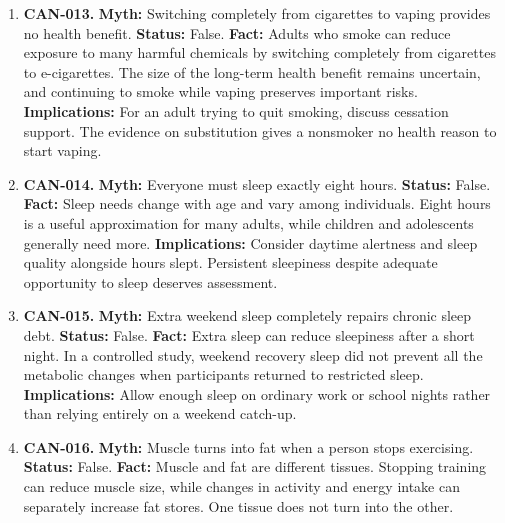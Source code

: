 \documentclass[11pt,oneside]{book}
\begin{document}
\begin{enumerate}[leftmargin=0pt,labelwidth=0pt,labelsep=0pt,itemindent=0pt]
\textbf{Implications:} Persistent cough or breathlessness warrants medical assessment. Describe any vaping and occupational exposures rather than assuming a specific diagnosis.
\item[] \textbf{CAN-013.} \textbf{Myth:} Switching completely from cigarettes to vaping provides no health benefit.\newline
\textbf{Status:} False.\newline
\textbf{Fact:} Adults who smoke can reduce exposure to many harmful chemicals by switching completely from cigarettes to e-cigarettes. The size of the long-term health benefit remains uncertain, and continuing to smoke while vaping preserves important risks. \cite{ref383,ref278}\newline
\textbf{Implications:} For an adult trying to quit smoking, discuss cessation support. The evidence on substitution gives a nonsmoker no health reason to start vaping.
\item[] \textbf{CAN-014.} \textbf{Myth:} Everyone must sleep exactly eight hours.\newline
\textbf{Status:} False.\newline
\textbf{Fact:} Sleep needs change with age and vary among individuals. Eight hours is a useful approximation for many adults, while children and adolescents generally need more. \cite{ref385}\newline
\textbf{Implications:} Consider daytime alertness and sleep quality alongside hours slept. Persistent sleepiness despite adequate opportunity to sleep deserves assessment.
\item[] \textbf{CAN-015.} \textbf{Myth:} Extra weekend sleep completely repairs chronic sleep debt.\newline
\textbf{Status:} False.\newline
\textbf{Fact:} Extra sleep can reduce sleepiness after a short night. In a controlled study, weekend recovery sleep did not prevent all the metabolic changes when participants returned to restricted sleep. \cite{ref386}\newline
\textbf{Implications:} Allow enough sleep on ordinary work or school nights rather than relying entirely on a weekend catch-up.
\item[] \textbf{CAN-016.} \textbf{Myth:} Muscle turns into fat when a person stops exercising.\newline
\textbf{Status:} False.\newline
\textbf{Fact:} Muscle and fat are different tissues. Stopping training can reduce muscle size, while changes in activity and energy intake can separately increase fat stores. One tissue does not turn into the other. \cite{ref387}\newline

\end{enumerate}
\end{document}
